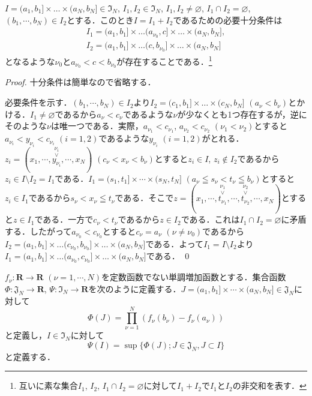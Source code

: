 \documentclass[12pt,a4paper]{jsarticle}
\newcommand{\real}{\mathbf{R}}
\newcommand{\frakI}{\mathfrak{I}}
\newcommand{\frakJ}{\mathfrak{J}}
\begin{document}
\begin{proposition}\label{prop1}
    $I = (a_1, b_1] \times \dots \times (a_N, b_N] \in \frakI_N$, $I_1, I_2 \in \frakI_N$, $I_1, I_2 \not= \varnothing$, $I_1 \cap I_2 = \varnothing$, $(b_1, \cdots, b_N) \in I_2$とする．このとき$I = I_1 + I_2$であるための必要十分条件は
    \begin{gather*}
    I_1 = (a_1, b_1] \times \dots (a_{\nu_0}, c] \times \dots \times (a_N, b_N], \\
    I_2 = (a_1, b_1] \times \dots (c, b_{\nu_0}] \times \dots \times (a_N, b_N]
    \end{gather*}
    となるような$\nu_0$と$a_{\nu_0} < c < b_{\nu_0}$が存在することである．\footnote{互いに素な集合$I_1$, $I_2$, $I_1 \cap I_2 = \varnothing$に対して$I_1 + I_2$で$I_1$と$I_2$の非交和を表す．}
\end{proposition}
\begin{proof}
    十分条件は簡単なので省略する．

    必要条件を示す．$(b_1, \cdots, b_N) \in I_2$より$I_2 = (c_1, b_1] \times \dots \times (c_N, b_N]$ $(a_\nu < b_\nu)$とかける．$I_1 \not= \varnothing$であるから$a_\nu < c_\nu$であるような$\nu$が少なくとも1つ存在するが，逆にそのような$\nu$は唯一つである．実際，$a_{\nu_1} < c_{\nu_1}$, $a_{\nu_2} < c_{\nu_2}$ $(\nu_1 < \nu_2)$とすると$a_{\nu_i} < y_{\nu_i} < c_{\nu_i}$ $(i = 1, 2)$であるような$y_{\nu_i}$ $(i = 1, 2)$がとれる．$z_i = (x_1, \cdots, \stackrel{\nu_i}{\stackrel{\vee}{y_{\nu_i}}}, \cdots, x_N )$ $(c_\nu < x_\nu < b_\nu)$とすると$z_i \in I$, $z_i \not \in I_2$であるから$z_i \in I \setminus I_2 = I_1$である．$I_1 = (s_1, t_1] \times \cdots \times (s_N, t_N]$ $(a_\nu \leqq s_\nu < t_\nu \leqq b_\nu)$とすると$z_i \in I_1$であるから$s_\nu < x_\nu \leqq t_\nu$である．そこで$z = (x_1, \cdots, \stackrel{\nu_1}{\stackrel{\vee}{t_{\nu_1}}}, \cdots, \stackrel{\nu_2}{\stackrel{\vee}{t_{\nu_2}}}, \cdots, x_N)$とすると$z \in I_1$である．一方で$c_\nu < t_\nu$であるから$z \in I_2$である．これは$I_1 \cap I_2 = \varnothing$に矛盾する．したがって$a_{\nu_0} < c_{\nu_0}$とすると$c_\nu = a_\nu$ $(\nu \not= \nu_0)$であるから$I_2 = (a_1, b_1] \times \dots (c_{\nu_0}, b_{\nu_0}] \times \dots \times (a_N, b_N]$である．よって$I_1 = I \setminus I_2$より$I_1 = (a_1, b_1] \times \dots (a_{\nu_0}, c_{\nu_0}] \times \dots \times (a_N, b_N]$である．
    \qed
\end{proof}

$f_\nu: \real \to \real$ $(\nu = 1, \cdots, N)$を定数函数でない単調増加函数とする．集合函数$\Phi: \frakJ_N \to \real$, $\Psi: \frakI_N \to \real$を次のように定義する．$J = (a_1, b_1] \times \cdots \times (a_N, b_N] \in \frakJ_N$に対して
\begin{equation*}
    \Phi(J) = \prod_{\nu = 1}^N (f_\nu(b_\nu) - f_\nu(a_\nu))
\end{equation*}
と定義し，$I \in \frakI_N$に対して
\begin{equation*}
    \Psi(I) = \sup\{\Phi(J) ; J \in \frakJ_N, J \subset I\}
\end{equation*}
と定義する．
\end{document}
